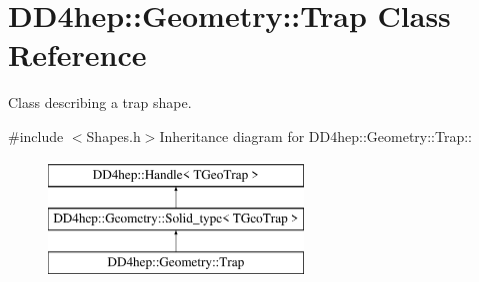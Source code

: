 \hypertarget{class_d_d4hep_1_1_geometry_1_1_trap}{
\section{DD4hep::Geometry::Trap Class Reference}
\label{class_d_d4hep_1_1_geometry_1_1_trap}
}


Class describing a trap shape.  


{\ttfamily \#include $<$Shapes.h$>$}Inheritance diagram for DD4hep::Geometry::Trap::\begin{figure}[H]
\begin{center}
\leavevmode
\includegraphics[height=3cm]{class_d_d4hep_1_1_geometry_1_1_trap}
\end{center}
\end{figure}
